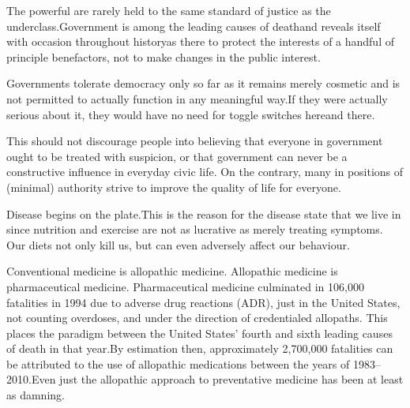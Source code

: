 
The powerful are rarely held to the same standard of justice as the underclass.
Government is among the leading causes of death and reveals itself with occasion throughout history\footnotecite[wilson2007]\footnotecite[favel2008]\footnotecite[bowie2012] as there to protect the interests of a handful of principle benefactors, not to make changes in the public interest. 

Governments tolerate democracy only so far as it remains merely cosmetic and is not permitted to actually function in any meaningful way. If they were actually serious about it, they would have no need for toggle switches here and there.

This should not discourage people into believing that everyone in government ought to be treated with suspicion, or that government can never be a constructive influence in everyday civic life. On the contrary, many in positions of (minimal) authority strive to improve the quality of life for everyone.


Disease begins on the plate. This is the reason for the disease state that we live in since nutrition and exercise are not as lucrative as merely treating symptoms. Our diets not only kill us, but can even adversely affect our behaviour.

Conventional medicine is allopathic medicine. Allopathic medicine is pharmaceutical medicine. Pharmaceutical medicine culminated in 106,000 fatalities in 1994 due to adverse drug reactions (ADR), just in the United States, not counting overdoses, and under the direction of credentialed allopaths. This places the paradigm between the United States' fourth and sixth leading causes of death in that year. By estimation then, approximately 2,700,000 fatalities can be attributed to the use of allopathic medications between the years of 1983--2010.\footnotecite[leape2000] Even just the allopathic approach to preventative medicine has been at least as damning.

